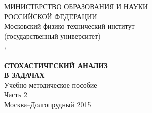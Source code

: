 

\thispagestyle{empty} 
\begin{center}

МИНИСТЕРСТВО ОБРАЗОВАНИЯ И НАУКИ \\
РОССИЙСКОЙ ФЕДЕРАЦИИ \\

 $ $ \\

Московский физико-технический институт \\
(государственный университет) \\
 
  $ $ \\ $ $ \\ $ $ \\
  $ $ \\
  $ $  \\
\smallskip
\smallskip
\premierAuthors, \\
\autresAuthors \\
 
 $ $ \\ $ $ \\
 
\textbf{СТОХАСТИЧЕСКИЙ АНАЛИЗ \\ В ЗАДАЧАХ} \\
 
 $ $ \\
  $ $ \\
  $ $ \\
Учебно-методическое пособие \\
 
  $ $ \\ $ $ \\ $ $ \\ $ $ \\
  \smallskip
   Часть 2
 $ $ \\ $ $ \\ $ $ \\ $ $ \\ $ $ \\ $ $ \\
 
Москва--Долгопрудный 2015


\end{center}

\newpage